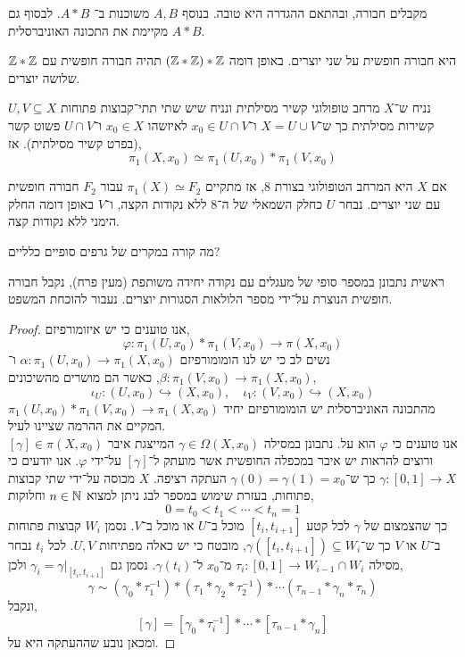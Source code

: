 \begin{exercise}
	מקבלים חבורה, ובהתאם ההגדרה היא טובה.
	בנוסף $A, B$ משוכנות ב־ $A * B$.
	לבסוף גם $A * B$ מקיימת את התכונה האוניברסלית.
\end{exercise}
\begin{remark}
	$\mathbb{Z} * \mathbb{Z}$ היא חבורה חופשית על שני יוצרים.
	באופן דומה $(\mathbb{Z} * \mathbb{Z}) * \mathbb{Z}$ תהיה חבורה חופשית עם שלושה יוצרים.
\end{remark}
\begin{theorem}
	נניח ש־$X$ מרחב טופולוגי קשיר מסילתית ונניח שיש שתי תתי־קבוצות פתוחות $U, V \subseteq X$ קשירות מסילתית כך ש־$X = U \cup V$ ו־$x_0 \in U \cap V$ לאיזשהו $x_0 \in X$ ו־$U \cap V$ פשוט קשר (בפרט קשיר מסילתית).
	אז,
	\[
		\pi_1(X, x_0)
		\simeq \pi_1(U, x_0) * \pi_1(V, x_0)
	\]
\end{theorem}
\begin{corollary}
	אם $X$ היא המרחב הטופולוגי בצורת 8, אז מתקיים $\pi_1(X) \simeq F_2$ עבור $F_2$ חבורה חופשית עם שני יוצרים.
	נבחר $U$ כחלק השמאלי של ה־8 ללא נקודות הקצה, ו־$V$ באופן דומה החלק הימני ללא נקודות קצה.
\end{corollary}
\begin{exercise}
	מה קורה במקרים של גרפים סופיים כלליים?
\end{exercise}
ראשית נתבונן במספר סופי של מעגלים עם נקודה יחידה משותפת (מעין פרח), נקבל חבורה חופשית הנוצרת על־ידי מספר הלולאות הסגורות יוצרים.
נעבור להוכחת המשפט.
\begin{proof}
	אנו טוענים כי יש איזומורפיזם,
	\[
		\varphi : \pi_1(U, x_0) * \pi_1(V, x_0) \to \pi(X, x_0)
	\]
	נשים לב כי יש לנו הומומורפיזם $\alpha : \pi_1(U, x_0) \to \pi_1(X, x_0)$ ו־$\beta : \pi_1(V, x_0) \to \pi_1(X, x_0)$, כאשר הם מושרים מהשיכונים,
	\[
		\iota_U : (U, x_0) \hookrightarrow (X, x_0),
		\quad
		\iota_V : (V, x_0) \hookrightarrow (X, x_0)
	\]
	מהתכונה האוניברסלית יש הומומורפיזם יחיד $\pi_1(U, x_0) * \pi_1(V, x_0) \to \pi_1(X, x_0)$ המקיים את ההרמה שציינו לעיל. \\
	אנו טוענים כי $\varphi$ הוא על.
	נתבונן במסילה $\gamma \in \Omega(X, x_0)$ המייצגת איבר $[\gamma] \in \pi(X, x_0)$ ורוצים להראות יש איבר במכפלה החופשית אשר מועתק ל־$[\gamma]$ על־ידי $\varphi$.
	אנו יודעים כי $\gamma : [0, 1] \to X$ כך ש־$\gamma(0) = \gamma(1) = x_0$ העתקה רציפה.
	$X$ מכוסה על־ידי שתי קבוצות פתוחות, בעזרת שימוש במספר לבג ניתן למצוא $n \in \mathbb{N}$ וחלוקות,
	\[
		0 = t_0 < t_1 < \cdots < t_n = 1
	\]
	כך שהצמצום של $\gamma$ לכל קטע $[t_i, t_{i + 1}]$ מוכל ב־$U$ או מוכל ב־$V$.
	נסמן $W_i$ קבוצות פתוחות ב־$U$ או $V$ כך ש־$\gamma([t_i, t_{i + 1}]) \subseteq W_i$, מובטח כי יש כאלה מפתיחות $U, V$.
	לכל $t_i$ נבחר מסילה $\tau_i : [0, 1] \to W_{i - 1} \cap W_i$ מ־$x_0$ ל־$\gamma(t_i)$.
	נסמן גם $\gamma_i = \gamma |_{[t_i, t_{i + 1}]}$ ולכן,
	\[
		\gamma
	\sim (\gamma_0 * \tau_1^{-1}) * (\tau_1 * \gamma_2 * \tau_2^{-1}) * \cdots (\tau_{n - 1} * \gamma_n * \tau_n)
	\]
	ונקבל,
	\[
		[\gamma] = [\gamma_0 * \tau_i^{-1}] * \cdots * [\tau_{n - 1} * \gamma_n]
	\]
	ומכאן נובע שההעתקה היא על.
\end{proof}

